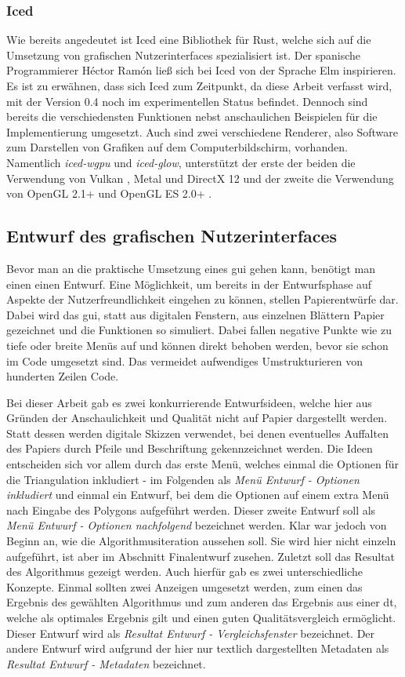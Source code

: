 \subsubsection{Iced}
Wie bereits angedeutet ist Iced eine Bibliothek für Rust, welche sich auf die Umsetzung von grafischen Nutzerinterfaces spezialisiert ist.
Der spanische Programmierer Héctor Ramón ließ sich bei Iced von der Sprache Elm inspirieren. Es ist zu erwähnen, dass sich Iced zum Zeitpunkt, da diese Arbeit verfasst wird, mit der Version 
0.4 noch im experimentellen Status befindet. Dennoch sind bereits die verschiedensten Funktionen nebst anschaulichen Beispielen für die Implementierung umgesetzt. Auch sind zwei verschiedene 
Renderer, also Software zum Darstellen von Grafiken auf dem Computerbildschirm, vorhanden. Namentlich \emph{iced-wgpu} und \emph{iced-glow}, unterstützt der erste der beiden die Verwendung von 
Vulkan \cite{vulkan}, Metal \cite{metal} und DirectX 12 \cite{dx12} und der zweite die Verwendung von OpenGL 2.1+ \cite{opgl} und OpenGL ES 2.0+ \cite{opgles}. \cite{iced}

\subsection{Entwurf des grafischen Nutzerinterfaces}
Bevor man an die praktische Umsetzung eines \ac{gui} gehen kann, benötigt man einen einen Entwurf. Eine Möglichkeit, um bereits in der Entwurfsphase auf Aspekte der Nutzerfreundlichkeit eingehen zu können, 
stellen Papierentwürfe dar. Dabei wird das \ac{gui}, statt aus digitalen Fenstern, aus einzelnen Blättern Papier gezeichnet und die Funktionen so simuliert. Dabei fallen negative Punkte wie zu tiefe oder breite 
Menüs auf und können direkt behoben werden, bevor sie schon im Code umgesetzt sind. Das vermeidet aufwendiges Umstrukturieren von hunderten Zeilen Code.

Bei dieser Arbeit gab es zwei konkurrierende Entwurfsideen, welche hier aus Gründen der Anschaulichkeit und Qualität nicht auf Papier dargestellt werden. Statt dessen werden digitale Skizzen verwendet, bei denen eventuelles Auffalten des Papiers
durch Pfeile und Beschriftung gekennzeichnet werden. 
Die Ideen entscheiden sich vor allem durch das erste Menü, welches einmal die Optionen für die Triangulation inkludiert - im Folgenden als \emph{Menü Entwurf - Optionen inkludiert} und einmal ein Entwurf, bei dem 
die Optionen auf einem extra Menü nach Eingabe des Polygons aufgeführt werden. Dieser zweite Entwurf soll als \emph{Menü Entwurf - Optionen nachfolgend} bezeichnet werden.
Klar war jedoch von Beginn an, wie die Algorithmusiteration aussehen soll. Sie wird hier nicht einzeln aufgeführt, ist aber im Abschnitt Finalentwurf zusehen.
Zuletzt soll das Resultat des Algorithmus gezeigt werden. Auch hierfür gab es zwei unterschiedliche Konzepte. Einmal sollten zwei Anzeigen umgesetzt werden, zum einen das Ergebnis des gewählten Algorithmus und zum anderen das 
Ergebnis aus einer \ac{dt}, welche als optimales Ergebnis gilt und einen guten Qualitätsvergleich ermöglicht. Dieser Entwurf wird als \emph{Resultat Entwurf - Vergleichsfenster} bezeichnet.
Der andere Entwurf wird aufgrund der hier nur textlich dargestellten Metadaten als \emph{Resultat Entwurf - Metadaten} bezeichnet.

